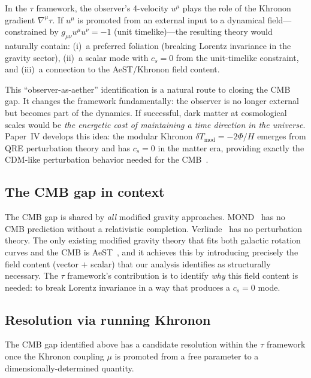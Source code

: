 \documentclass[prd,twocolumn,superscriptaddress,longbibliography,floatfix]{revtex4-2}
\newcommand{\tauasym}{\tau}
\begin{document}
In the $\tauasym$ framework, the observer's 4-velocity $u^\mu$
plays the role of the Khronon gradient
$\nabla^\mu \tauasym$.  If $u^\mu$ is promoted from an
external input to a dynamical field---constrained by
$g_{\mu\nu} u^\mu u^\nu = -1$ (unit timelike)---the resulting
theory would naturally contain:
(i)~a preferred foliation (breaking Lorentz invariance in the
gravity sector),
(ii)~a scalar mode with $c_s = 0$ from the unit-timelike
constraint, and
(iii)~a connection to the AeST/Khronon field content.

This ``observer-as-aether'' identification
is a natural route to closing the CMB gap.  It changes
the framework fundamentally: the observer is no longer external
but becomes part of the dynamics.  If successful, dark matter at
cosmological scales would be \emph{the energetic cost of
maintaining a time direction in the universe}.  Paper~IV
develops this idea: the modular Khronon
$\delta T_{\mathrm{mod}} = -2\Phi/H$ emerges from QRE
perturbation theory and has $c_s = 0$ in the matter era,
providing exactly the CDM-like perturbation behavior needed
for the CMB~\cite{Paper4}.

\subsection{The CMB gap in context}

The CMB gap is shared by \emph{all} modified gravity
approaches.  MOND~\cite{Milgrom1983} has no CMB prediction
without a relativistic completion.
Verlinde~\cite{Verlinde2016} has no perturbation theory.
The only existing modified gravity theory that fits both
galactic rotation curves and the CMB is
AeST~\cite{Skordis2021}, and it achieves this by introducing
precisely the field content (vector $+$ scalar) that our
analysis identifies as structurally necessary.  The $\tauasym$
framework's contribution is to identify \emph{why} this field
content is needed: to break Lorentz invariance in a way that
produces a $c_s = 0$ mode.

\subsection{Resolution via running Khronon}
\label{sec:khronon_resolution}

The CMB gap identified above has a candidate resolution within
the $\tauasym$ framework once the Khronon coupling $\mu$ is
promoted from a free parameter to a dimensionally-determined
quantity.
\end{document}
